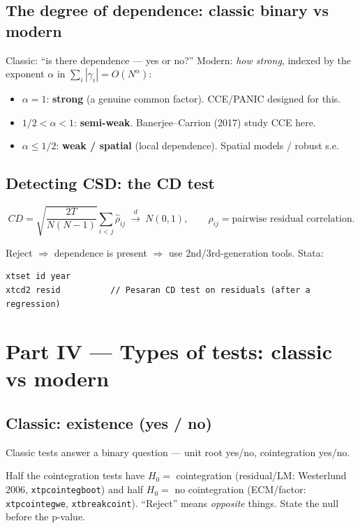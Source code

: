 \documentclass[11pt,a4paper]{article}
\newcommand{\cmd}[1]{\texttt{\textcolor{camber}{#1}}}
\newcommand{\hlt}[2]{\textcolor{#1}{\textbf{#2}}}
\theoremstyle{definition}
\begin{document}
\subsection{The degree of dependence: classic binary vs modern}
\begin{begbox}
Classic: ``is there dependence --- yes or no?'' Modern: \emph{how strong}, indexed by the exponent
$\alpha$ in $\sum_i|\gamma_i|=O(N^{\alpha})$:
\begin{itemize}[leftmargin=1.2em,itemsep=0pt]
 \item $\alpha=1$: \hlt{cred}{strong} (a genuine common factor). CCE/PANIC designed for this.
 \item $1/2<\alpha<1$: \hlt{camber}{semi-weak}. Banerjee--Carrion (2017) study CCE here.
 \item $\alpha\le 1/2$: \hlt{cteal}{weak / spatial} (local dependence). Spatial models / robust s.e.
\end{itemize}
\end{begbox}

\subsection{Detecting CSD: the CD test}
\begin{eqbox}
\[
CD=\sqrt{\frac{2T}{N(N-1)}}\sum_{i<j}\hat\rho_{ij}\ \xrightarrow{d}\ N(0,1),\qquad
\hat\rho_{ij}=\text{pairwise residual correlation.}
\]
\end{eqbox}
Reject $\Rightarrow$ dependence is present $\Rightarrow$ use 2nd/3rd-generation tools. Stata:
\begin{lstlisting}
xtset id year
xtcd2 resid          // Pesaran CD test on residuals (after a regression)
\end{lstlisting}

\section{Part IV --- Types of tests: classic vs modern}

\subsection{Classic: existence (yes / no)}
Classic tests answer a binary question --- unit root yes/no, cointegration yes/no.
\begin{warnbox}
Half the cointegration tests have $H_0=$ cointegration (residual/LM: Westerlund 2006,
\cmd{xtpcointegboot}) and half $H_0=$ no cointegration (ECM/factor: \cmd{xtpcointegwe},
\cmd{xtbreakcoint}). ``Reject'' means \emph{opposite} things. State the null before the p-value.
\end{warnbox}
\end{document}
